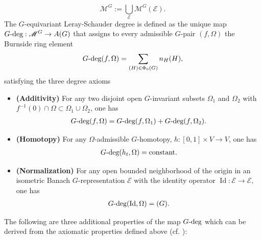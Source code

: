 \documentclass[twoside]{article}%
\def\gdeg{G\text{\rm -deg}}
\DeclareMathOperator{\id}{Id}
\begin{document}
\[
\mathscr M^G := \bigcup_{\mathscr E} \mathscr M^G(\mathscr E).
\]
The $G$-equivariant Leray-Schauder degree is defined as the unique map $\gdeg: \mathscr M^G \rightarrow A(G)$ that assigns to every admissible $G$-pair $(f,\Omega)$ the Burnside ring element
	\begin{align}
		\label{eq:G-deg0}\gdeg(f,\Omega)=\sum_{(H) \in \Phi_0(G)}%
		{n_{H}(H)},
	\end{align}
satisfying the three degree axioms
	\begin{itemize}
		\item[] \textbf{(Additivity)} 
  For any two  disjoint open $G$-invariant subsets
  $\Omega_{1}$ and $\Omega_{2}$ with
		$f^{-1}(0)\cap\Omega\subset\Omega_{1}\cup\Omega_{2}$, one has
		\begin{align*}
			\gdeg(f,\Omega)=\gdeg(f,\Omega_{1})+\gdeg
			(f,\Omega_{2}).
		\end{align*}
		
		
		\item[] \textbf{(Homotopy)} For any 
  $\Omega$-admissible $G$-homotopy, $h:[0,1]\times V\to V$, one has
		\begin{align*}
			\gdeg(h_{t},\Omega)=\mathrm{constant}.
		\end{align*}
		
		
		\item[] \textbf{(Normalization)}
  For any open bounded neighborhood of the origin in an isometric Banach $G$-representation $\mathscr E$ with the identity operator $\id:\mathscr E \rightarrow \mathscr E$, one has
		\begin{align*}
			\gdeg(\id,\Omega)=(G).
		\end{align*}
	\end{itemize}
The following are three additional properties of the map $\gdeg$ which can be derived from the axiomatic properties defined above (cf. \cite{book-new, AED}):		
\end{document}
